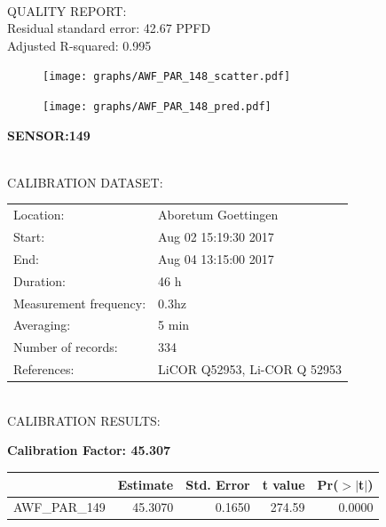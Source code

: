 \documentclass[oneside]{report}
\begin{document}
\hrulefill\\
QUALITY REPORT:\\
Residual standard error: 42.67 PPFD\\
Adjusted R-squared: 0.995



\begin{figure}[H]
  \centering
  \texttt{[image: graphs/AWF\_PAR\_148\_scatter.pdf]}
\end{figure}




\begin{figure}[H]
  \centering
  \texttt{[image: graphs/AWF\_PAR\_148\_pred.pdf]}
\end{figure}

\pagebreak


\begin{center}
\large{\textbf{SENSOR:149}}\\
\end{center}

\hrulefill\\
CALIBRATION DATASET:\\
\begin{table}[h!]
  \centering
  \label{tab:table1}
  \begin{tabular}{ll}
    Location: & Aboretum Goettingen\\ 
    
    
    Start:  & Aug 02 15:19:30 2017 \\
    End:   & Aug 04 13:15:00 2017\\ 
    Duration: & 46 h\\
    Measurement frequency: & 0.3hz\\
    Averaging:  &5 min\\
    Number of records: & 334 \\
    References: & LiCOR Q52953, Li-COR Q 52953 \\
  \end{tabular}
\end{table}

\hrulefill\\
CALIBRATION RESULTS:\\


\begin{center}
\textbf{\large{Calibration Factor: 45.307}}\\
\end{center}
\begin{table}[ht]
\centering
\begin{tabular}{rrrrr}
  \hline
 & Estimate & Std. Error & t value & Pr($>$$|$t$|$) \\ 
  \hline
AWF\_PAR\_149 & 45.3070 & 0.1650 & 274.59 & 0.0000 \\ 
   \hline
\end{tabular}
\end{table}
\end{document}
